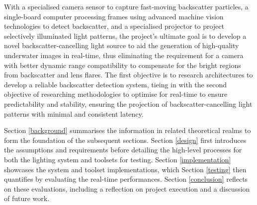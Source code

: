 With a specialised camera sensor to capture fast-moving backscatter particles, a single-board computer processing frames using advanced machine vision technologies to detect backscatter, and a specialised projector to project selectively illuminated light patterns, the project's ultimate goal is to develop a novel backscatter-cancelling light source to aid the generation of high-quality underwater images in real-time, thus eliminating the requirement for a camera with better dynamic range compatibility to compensate for the bright regions from backscatter and lens flares. The first objective is to research architectures to develop a reliable backscatter detection system, tieing in with the second objective of researching methodologies to optimise for real-time to ensure predictability and stability, ensuring the projection of backscatter-cancelling light patterns with minimal and consistent latency.

Section \ref{background} summarises the information in related theoretical realms to form the foundation of the subsequent sections. Section \ref{design} first introduces the assumptions and requirements before detailing the high-level processes for both the lighting system and toolsets for testing. Section \ref{implementation} showcases the system and toolset implementations, which Section \ref{testing} then quantifies by evaluating the real-time performances. Section \ref{conclusion} reflects on these evaluations, including a reflection on project execution and a discussion of future work.
